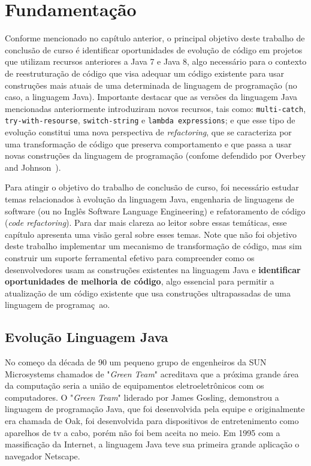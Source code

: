 %
%
\chapter{Fundamentação}

Conforme mencionado no capítulo anterior, o principal objetivo deste trabalho de conclusão de curso é 
identificar oportunidades de evolução de código em projetos que utilizam recursos anteriores a Java 7 e Java 8, 
algo necess\'{a}rio para o contexto de reestrutura\c c\~{a}o de c\'{o}digo que visa adequar um c\'{o}digo 
existente para usar constru\c c\~{o}es mais atuais de uma determinada de linguagem de programa\c c\~{a}o 
(no caso, a linguagem Java). Importante destacar que as vers\~{o}es da linguagem Java mencionadas anteriormente
introduziram novos recursos, tais como: \texttt{multi-catch}, \texttt{try-with-resourse}, \texttt{switch-string} 
e \texttt{lambda expressions}; e que esse tipo de evolução constitui uma nova perspectiva de \textit{refactoring}, que se caracteriza 
por uma transforma\c c\~{a}o de c\'{o}digo que preserva comportamento e que passa a usar  
novas constru\c c\~{o}es da linguagem de programa\c c\~{a}o (confome defendido por Overbey and Johnson~\cite{Overbey:2009}). 

Para atingir o objetivo do trabalho de conclus\~{a}o de curso, foi necess\'{a}rio estudar temas relacionados 
\`{a} evolu\c c\~{a}o da linguagem Java, engenharia de linguagens de software (ou no Ingl\^{e}s Software 
Language Engineering) e refatoramento de c\'{o}digo (\emph{code refactoring}).  Para dar mais clareza ao leitor 
sobre essas temáticas, esse capítulo apresenta uma vis\~{a}o geral sobre esses temas. Note que n\~{a}o foi objetivo
deste trabalho implementar um mecanismo de transforma\c c\~{a}o de c\'{o}digo, mas sim construir um suporte ferramental 
efetivo para compreender como os desenvolvedores usam as constru\c c\~{o}es existentes na linguagem Java e {\bf identificar 
oportunidades de melhoria de c\'{o}digo}, algo essencial para permitir a atualiza\c c\~{a}o de um c\'{o}digo existente 
que usa constru\c c\~{o}es ultrapassadas de uma linguagem de programa\c c~{a}o. 
 
\section{Evolução Linguagem Java}\label{sec:evolucaoJava}

No começo da década de 90 um pequeno grupo de engenheiros da SUN Microsystems chamados de "\textit{Green Team}" acreditava que a próxima grande área da computação seria a união de equipamentos eletroeletrônicos com os computadores. O "\textit{Green Team}" liderado por James Gosling, demonstrou a linguagem de programação Java, que foi desenvolvida pela equipe e originalmente era chamada de Oak, foi desenvolvida para dispositivos de entretenimento como aparelhos de tv a cabo, porém não foi bem aceita no meio. Em 1995 com a massificação da Internet, a linguagem Java teve sua primeira grande aplicação o navegador Netscape.

